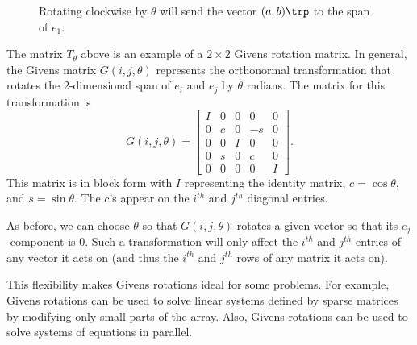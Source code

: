 \begin{figure}
\begin{center}
\caption{Rotating clockwise by $\theta$ will send the vector $(a,b)\trp$ to the span of $e_1$.}
\label{fig:angle}
\end{center}
\end{figure}

The matrix $T_{\theta}$ above is an example of a $2 \times 2$ Givens rotation matrix.
In general, the Givens matrix $G(i,j,\theta)$ represents the orthonormal transformation that rotates the 2-dimensional span of $e_i$ and $e_j$ by $\theta$ radians.
The matrix for this transformation is
\begin{equation*}
G(i,j,\theta) =
\left[\begin{array}{ccccc}
I & 0 & 0 & 0 & 0 \\
0 & c & 0 & -s & 0 \\
0 & 0 & I & 0 & 0 \\
0 & s & 0 & c & 0 \\
0 & 0 & 0 & 0 & I
\end{array}\right].
\end{equation*}
This matrix is in block form with $I$ representing the identity matrix, $c=\cos \theta$, and $s=\sin \theta$.
The $c$'s appear on the $i^{th}$ and $j^{th}$ diagonal entries.

As before, we can choose $\theta$ so that $G(i,j,\theta)$ rotates a given vector so that its $e_j$-component is 0.
Such a transformation will only affect the $i^{th}$ and $j^{th}$ entries of any vector it acts on (and thus the $i^{th}$ and $j^{th}$ rows of any matrix it acts on).

This flexibility makes Givens rotations ideal for some problems.
For example, Givens rotations can be used to solve linear systems defined by sparse matrices by modifying only small parts of the array.
Also, Givens rotations can be used to solve systems of equations in parallel.

